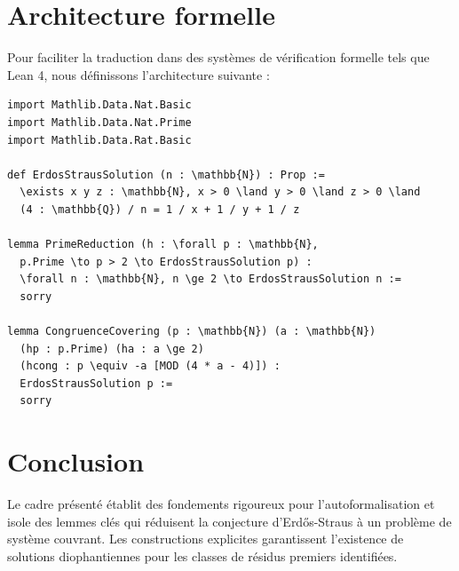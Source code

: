 \documentclass[12pt,a4paper]{article}
\begin{document}
\section{Architecture formelle}

Pour faciliter la traduction dans des systèmes de vérification formelle tels que Lean 4, nous définissons l'architecture suivante :

\begin{verbatim}
import Mathlib.Data.Nat.Basic
import Mathlib.Data.Nat.Prime
import Mathlib.Data.Rat.Basic

def ErdosStrausSolution (n : \mathbb{N}) : Prop :=
  \exists x y z : \mathbb{N}, x > 0 \land y > 0 \land z > 0 \land
  (4 : \mathbb{Q}) / n = 1 / x + 1 / y + 1 / z

lemma PrimeReduction (h : \forall p : \mathbb{N},
  p.Prime \to p > 2 \to ErdosStrausSolution p) :
  \forall n : \mathbb{N}, n \ge 2 \to ErdosStrausSolution n :=
  sorry

lemma CongruenceCovering (p : \mathbb{N}) (a : \mathbb{N})
  (hp : p.Prime) (ha : a \ge 2)
  (hcong : p \equiv -a [MOD (4 * a - 4)]) :
  ErdosStrausSolution p :=
  sorry
\end{verbatim}

\section{Conclusion}
Le cadre présenté établit des fondements rigoureux pour l'autoformalisation et isole des lemmes clés qui réduisent la conjecture d'Erd\H{o}s-Straus à un problème de système couvrant. Les constructions explicites garantissent l'existence de solutions diophantiennes pour les classes de résidus premiers identifiées.
\end{document}
